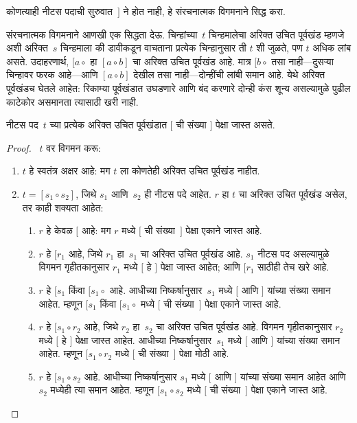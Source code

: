 \documentclass[../../../include/open-logic-section]{subfiles}
\begin{document}
\begin{prob}
कोणत्याही नीटस पदाची सुरुवात~$]$ ने होत नाही, हे संरचनात्मक विगमनाने सिद्ध करा.
\end{prob}

संरचनात्मक विगमनाने आणखी एक सिद्धता देऊ. चिन्हांच्या~$t$ चिन्हमालेचा अरिक्त उचित पूर्वखंड म्हणजे अशी अरिक्त~$s$ चिन्हमाला की डावीकडून वाचताना प्रत्येक चिन्हानुसार ती $t$ शी जुळते, पण $t$ अधिक लांब असते. उदाहरणार्थ, $[a \circ {}$ हा $[a \circ b]$ चा अरिक्त उचित पूर्वखंड आहे. मात्र $[b \circ {}$ तसा नाही---दुसऱ्या चिन्हावर फरक आहे---आणि $[a \circ b]$ देखील तसा नाही---दोन्हींची लांबी समान आहे. येथे अरिक्त पूर्वखंडच घेतले आहेत: रिकाम्या पूर्वखंडात उघडणारे आणि बंद करणारे दोन्ही कंस शून्य असल्यामुळे पुढील काटेकोर असमानता त्यासाठी खरी नाही.

\begin{prop}
नीटस पद~$t$ च्या प्रत्येक अरिक्त उचित पूर्वखंडात $[$ ची संख्या $]$ पेक्षा जास्त असते.
\end{prop}

\begin{proof}
~$t$ वर विगमन करू:
\begin{enumerate}
\item $t$ हे स्वतंत्र अक्षर आहे: मग $t$ ला कोणतेही अरिक्त उचित पूर्वखंड नाहीत.
\item $t = [s_1 \circ s_2]$, जिथे $s_1$ आणि~$s_2$ ही नीटस पदे आहेत. $r$ हा $t$ चा अरिक्त उचित पूर्वखंड असेल, तर काही शक्यता आहेत:
\begin{enumerate}
\item $r$ हे केवळ $[$ आहे: मग $r$ मध्ये $[$ ची संख्या~$]$ पेक्षा एकाने जास्त आहे.
\item $r$ हे $[r_1$ आहे, जिथे $r_1$ हा~$s_1$ चा अरिक्त उचित पूर्वखंड आहे. $s_1$ नीटस पद असल्यामुळे विगमन गृहीतकानुसार $r_1$ मध्ये $[$ हे $]$ पेक्षा जास्त आहेत; आणि $[r_1$ साठीही तेच खरे आहे.
\item $r$ हे $[s_1$ किंवा $[s_1 \circ {}$ आहे. आधीच्या निष्कर्षानुसार~$s_1$ मध्ये $[$ आणि $]$ यांच्या संख्या समान आहेत. म्हणून $[s_1$ किंवा $[s_1 \circ {}$ मध्ये $[$ ची संख्या~$]$ पेक्षा एकाने जास्त आहे.
\item $r$ हे $[s_1 \circ r_2$ आहे, जिथे $r_2$ हा~$s_2$ चा अरिक्त उचित पूर्वखंड आहे. विगमन गृहीतकानुसार $r_2$ मध्ये $[$ हे $]$ पेक्षा जास्त आहेत. आधीच्या निष्कर्षानुसार~$s_1$ मध्ये $[$ आणि $]$ यांच्या संख्या समान आहेत. म्हणून $[s_1 \circ r_2$ मध्ये $[$ ची संख्या~$]$ पेक्षा मोठी आहे.
\item $r$ हे $[s_1 \circ s_2$ आहे. आधीच्या निष्कर्षानुसार $s_1$ मध्ये $[$ आणि $]$ यांच्या संख्या समान आहेत आणि~$s_2$ मध्येही त्या समान आहेत. म्हणून $[s_1 \circ s_2$ मध्ये $[$ ची संख्या~$]$ पेक्षा एकाने जास्त आहे.
\end{enumerate}
\end{enumerate}
\end{proof}
\end{document}

